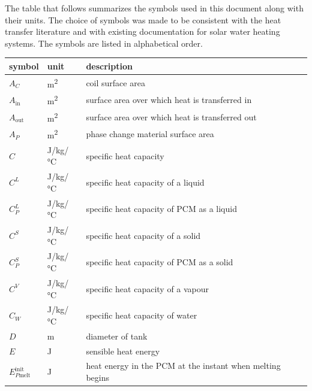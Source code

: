 \documentclass[12pt]{article}
\begin{document}
The table that follows summarizes the symbols used in this document along with
their units.  The choice of symbols was made to be consistent with the heat
transfer literature and with existing documentation for solar water heating
systems.  The symbols are listed in alphabetical order.

\renewcommand{\arraystretch}{1.2}
\noindent \begin{longtable*}{l l p{12cm}} \toprule
  \textbf{symbol} & \textbf{unit} & \textbf{description}\\
  \midrule 
  $A_C$ & \si[per-mode=symbol] {\square\metre} & coil surface area
  \\
  $A_\text{in}$ & \si[per-mode=symbol] {\square\metre} & surface area over 
  which heat is transferred in
  \\ 
  $A_\text{out}$ & \si[per-mode=symbol] {\square\metre} & surface area over 
  which heat is transferred out
  \\
  $A_P$ & \si[per-mode=symbol] {\square\metre} & phase change material surface
  area
  \\ 
  $C$ & \si[per-mode=symbol] {\joule\per \kilogram\per \celsius} &
  specific heat capacity
  \\
  $C^L$ & \si[per-mode=symbol] {\joule\per\kilo\gram\per\celsius} & specific 
  heat capacity of a liquid 
  \\ 
  $C^L_P$ & \si[per-mode=symbol] {\joule\per \kilogram\per \celsius} & specific
  heat capacity of PCM as a liquid
  \\
  $C^S$ & \si[per-mode=symbol] {\joule\per\kilo\gram\per\celsius} & specific 
  heat capacity of a solid
  \\
  $C^S_P$ & \si[per-mode=symbol] {\joule\per \kilogram\per \celsius} & specific
  heat capacity of PCM as a solid
  \\
  $C^V$ & \si[per-mode=symbol] {\joule\per \kilogram\per \celsius} & specific
  heat capacity of a vapour
  \\
  $C_W$ & \si[per-mode=symbol] {\joule\per \kilogram\per \celsius} & specific
  heat capacity of water
  \\  
  $D$ & \si{\metre} & diameter of tank
  \\
  $E$ & \si[per-mode=symbol] {\joule} & sensible heat energy
  \\
  $E_{P\text{melt}}^\text{init}$ & \si[per-mode=symbol] {\joule} & heat energy
  in the PCM at the instant when melting begins
  \\ 

\end{longtable*}
\end{document}
